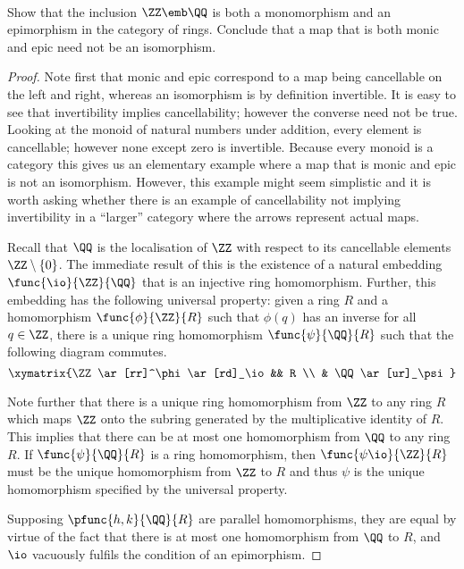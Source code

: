 \documentclass[main.tex]{subfiles}
\begin{document}
\paragraph{}
\begin{exercise}
	Show that the inclusion \(\ZZ\emb\QQ\) is both a monomorphism and an
	epimorphism in the category \Ring of rings. Conclude that a map that is both
	monic and epic need not be an isomorphism.
\end{exercise}
\begin{proof}
	Note first that monic and epic correspond to a map being cancellable on the
	left and right, whereas an isomorphism is by definition invertible. It is
	easy to see that invertibility implies cancellability; however the converse
	need not be true. Looking at the monoid of natural numbers under addition,
	every element is cancellable; however none except zero is invertible.
	Because every monoid is a category this gives us an elementary example where
	a map that is monic and epic is not an isomorphism. However, this example
	might seem simplistic and it is worth asking whether there is an example of
	cancellability not implying invertibility in a ``larger'' category where the
	arrows represent actual maps.

	Recall that \(\QQ\) is the localisation of \(\ZZ\) with respect to its
	cancellable elements \(\ZZ\setminus\{0\}\). The immediate result of this is
	the existence of a natural embedding \(\func{\io}{\ZZ}{\QQ}\) that is an
	injective ring homomorphism. Further, this embedding has the following
	universal property: given a ring \(R\) and a homomorphism
	\(\func{\phi}{\ZZ}{R}\) such that \(\phi(q)\) has an inverse for all
	\(q\in\ZZ\), there is a unique ring homomorphism \(\func{\psi}{\QQ}{R}\)
	such that the following diagram commutes.
	\[\xymatrix{\ZZ \ar[rr]^\phi \ar[rd]_\io && R \\ & \QQ \ar[ur]_\psi}\]

	Note further that there is a unique ring homomorphism from \(\ZZ\) to any
	ring \(R\) which maps \(\ZZ\) onto the subring generated by the
	multiplicative identity of \(R\). This implies that there can be at most one
	homomorphism from \(\QQ\) to any ring \(R\). If \(\func{\psi}{\QQ}{R}\) is a
	ring homomorphism, then \(\func{\psi\io}{\ZZ}{R}\) must be the unique
	homomorphism from \(\ZZ\) to \(R\) and thus \(\psi\) is the unique
	homomorphism specified by the universal property.

	Supposing \(\pfunc{h,k}{\QQ}{R}\) are parallel homomorphisms, they are equal
	by virtue of the fact that there is at most one homomorphism from \(\QQ\) to
	\(R\), and \(\io\) vacuously fulfils the condition of an epimorphism.
\end{proof}
\end{document}
